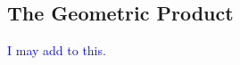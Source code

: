         \subsection{The Geometric Product}
        
        \textcolor{blue}{I may add to this.}
        
  
        
